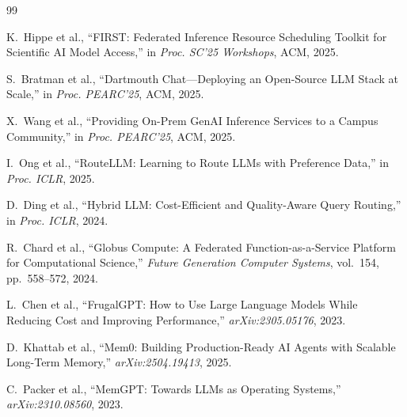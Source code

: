 \documentclass[manuscript, review]{acmart}
\begin{document}
\begin{thebibliography}{99}

K.~Hippe et al.,
``FIRST: Federated Inference Resource Scheduling Toolkit for Scientific AI Model Access,''
in \textit{Proc. SC'25 Workshops}, ACM, 2025.

S.~Bratman et al.,
``Dartmouth Chat---Deploying an Open-Source LLM Stack at Scale,''
in \textit{Proc. PEARC'25}, ACM, 2025.

X.~Wang et al.,
``Providing On-Prem GenAI Inference Services to a Campus Community,''
in \textit{Proc. PEARC'25}, ACM, 2025.

I.~Ong et al.,
``RouteLLM: Learning to Route LLMs with Preference Data,''
in \textit{Proc. ICLR}, 2025.

D.~Ding et al.,
``Hybrid LLM: Cost-Efficient and Quality-Aware Query Routing,''
in \textit{Proc. ICLR}, 2024.

R.~Chard et al.,
``Globus Compute: A Federated Function-as-a-Service Platform for Computational Science,''
\textit{Future Generation Computer Systems}, vol.~154, pp.~558--572, 2024.

L.~Chen et al.,
``FrugalGPT: How to Use Large Language Models While Reducing Cost and Improving Performance,''
\textit{arXiv:2305.05176}, 2023.

D.~Khattab et al.,
``Mem0: Building Production-Ready AI Agents with Scalable Long-Term Memory,''
\textit{arXiv:2504.19413}, 2025.

C.~Packer et al.,
``MemGPT: Towards LLMs as Operating Systems,''
\textit{arXiv:2310.08560}, 2023.

\end{thebibliography}
\end{document}
